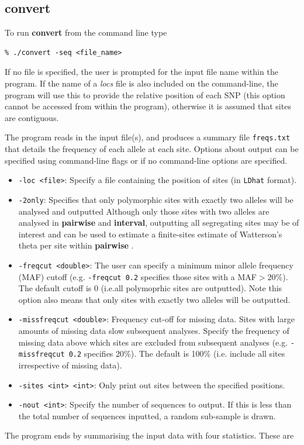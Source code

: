 \documentclass[a4paper,10pt,fullpage]{article}
\begin{document}
\subsection{convert}
To run {\bf convert} from the command line type\\
\begin{verbatim}
% ./convert -seq <file_name> 
\end{verbatim}
If no file is specified, the user is prompted for the input file
name within the program.  If the name of a {\it locs} file is also
included on the command-line, the program will use this to provide
the relative position of each SNP (this option cannot be accessed
from within the program), otherwise it is assumed that sites are
contiguous.

The program reads in the input file(s), and produces a summary
file {\verb+freqs.txt+} that details the frequency of each allele at
each site.  Options about output can be specified using command-line flags or if no command-line options are specified.

\begin{itemize}
\item \verb+-loc <file>+: Specify a file containing the position of  sites (in \verb+LDhat+ format).
\item \verb+-2only+: Specifies that only polymorphic sites with exactly two alleles will be analysed and outputted  Although
only those sites with two alleles are analysed in {\bf pairwise} and
{\bf interval}, outputting all segregating sites may be
of interest and can be used to estimate a finite-sites estimate of
Watterson's theta per site within {\bf pairwise} \cite{McVeanetal02}.  

\item \verb+-freqcut <double>+: The user
can specify a minimum minor allele frequency (MAF) cutoff (e.g.
\verb+-freqcut 0.2+ specifies those sites with a MAF$>20$\%). The default cutoff is 0 (i.e.all polymoprhic sites are outputted).  Note this option also means that only sites with exactly two alleles will be outputted.

\item \verb+-missfreqcut <double>+:  Frequency cut-off for missing data. Sites with large amounts
of missing data slow subsequent analyses. Specify the frequency of
missing data above which sites are excluded from subsequent
analyses (e.g. \verb+-missfreqcut 0.2+ specifies 20\%).  The default is 100\% (i.e. include all sites irrespective of missing data).

\item \verb+-sites <int> <int>+: Only print out sites between the specified positions.

\item \verb+-nout <int>+: Specify the number of sequences to output.  If this is less than the total number of sequences inputted, a random sub-sample is drawn.
 
\end{itemize}
\noindent The program ends by summarising the input data with four
statistics.  These are
\end{document}

